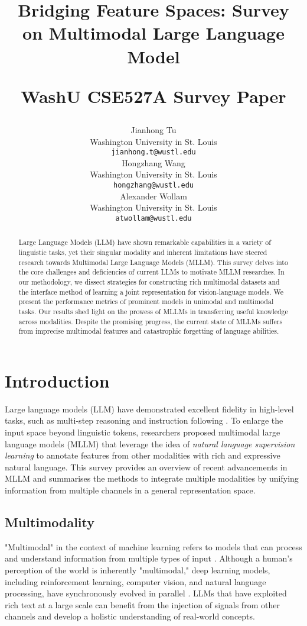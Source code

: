 \documentclass[11pt]{article}
\title{Bridging Feature Spaces: Survey on Multimodal Large Language Model



 \vspace{1em}
  \small{\normalfont WashU CSE527A Survey Paper} }
\author{Jianhong Tu \\
  Washington University in St. Louis \\
  \texttt{jianhong.t@wustl.edu} \\\And
  Hongzhang Wang \\
  Washington University in St. Louis \\
  \texttt{hongzhang@wustl.edu} \\\AND
  Alexander Wollam \\
  Washington University in St. Louis \\
  \texttt{atwollam@wustl.edu} \\}
\begin{document}
\maketitle

\begin{abstract}
Large Language Models (LLM) have shown remarkable capabilities in a variety of linguistic tasks, yet their singular modality and inherent limitations have steered research towards Multimodal Large Language Models (MLLM). This survey delves into the core challenges and deficiencies of current LLMs to motivate MLLM researches. In our methodology, we dissect strategies for constructing rich multimodal datasets and the interface method of learning a joint representation for vision-language models. We present the performance metrics of prominent models in unimodal and multimodal tasks. Our results shed light on the prowess of MLLMs in transferring useful knowledge across modalities. Despite the promising progress, the current state of MLLMs suffers from imprecise multimodal features and catastrophic forgetting of language abilities.

\end{abstract}

\section{Introduction}
Large language models (LLM) have demonstrated excellent fidelity in high-level tasks, such as multi-step reasoning \citep{DBLP:journals/corr/abs-2112-11446} and instruction following \citep{DBLP:conf/nips/Ouyang0JAWMZASR22}. To enlarge the input space beyond linguistic tokens, researchers proposed multimodal large language models (MLLM) that leverage the idea of \textit{natural language supervision learning} \citep{DBLP:conf/icml/RadfordKHRGASAM21} to annotate features from other modalities with rich and expressive natural language. This survey provides an overview of recent advancements in MLLM and summarises the methods to integrate multiple modalities by unifying information from multiple channels in a general representation space.

\subsection{Multimodality}
"Multimodal" in the context of machine learning refers to models that can process and understand information from multiple types of input \citep{kress2009multimodality}. Although a human's perception of the world is inherently "multimodal," deep learning models, including reinforcement learning, computer vision, and natural language processing, have synchronously evolved in parallel \citep{DBLP:journals/corr/abs-2306-13549}. LLMs that have exploited rich text at a large scale can benefit from the injection of signals from other channels and develop a holistic understanding of real-world concepts.
\end{document}
